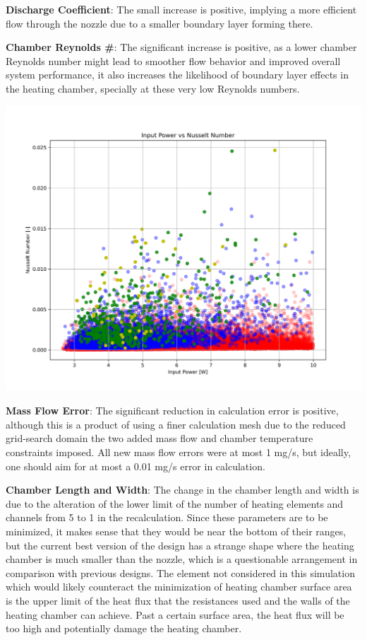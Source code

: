 \documentclass{homework}
\begin{document}
\begin{multicols}{2}
\textbf{Discharge Coefficient}: The small increase is positive, implying a more efficient flow through the nozzle due to a smaller boundary layer forming there.

\textbf{Chamber Reynolds \#}: The significant increase is positive, as a lower chamber Reynolds number might lead to smoother flow behavior and improved overall system performance, it also increases the likelihood of boundary layer effects in the heating chamber, specially at these very low Reynolds numbers.

\begin{minipage}{\linewidth}
      \centering
      \includegraphics[width=\linewidth]{images/input_power_nusselt_number.png}
      \label{fig:power_nusselt}
  \end{minipage}

\textbf{Mass Flow Error}: The significant reduction in calculation error is positive, although this is a product of using a finer calculation mesh due to the reduced grid-search domain the two added mass flow and chamber temperature constraints imposed. All new mass flow errors were at most 1 mg/s, but ideally, one should aim for at most a 0.01 mg/s error in calculation.

\textbf{Chamber Length and Width}: The change in the chamber length and width is due to the alteration of the lower limit of the number of heating elements and channels from 5 to 1 in the recalculation. Since these parameters are to be minimized, it makes sense that they would be near the bottom of their ranges, but the current best version of the design has a strange shape where the heating chamber is much smaller than the nozzle, which is a questionable arrangement in comparison with previous designs. The element not considered in this simulation which would likely counteract the minimization of heating chamber surface area is the upper limit of the heat flux that the resistances used and the walls of the heating chamber can achieve. Past a certain surface area, the heat flux will be too high and potentially damage the heating chamber. 


\end{multicols}
\end{document}
